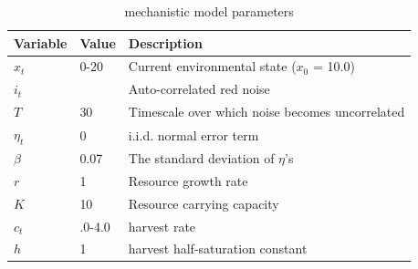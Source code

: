 \documentclass[openacc]{rsproca_new}%
\begin{document}
\begin{table}[H]
    \caption{\textcite{Tilman2024} mechanistic model parameters}
    \begin{tabular}{l|l|l}
    \hline
        \textbf{Variable} & \textbf{Value} & \textbf{Description} \\ \hline
        $x_t$ & 0-20 & Current environmental state ($x_0$ = 10.0) \\ 
        $i_t$ &  & Auto-correlated red noise \\ 
        $T$ & 30 & Timescale over which noise becomes uncorrelated \\ 
        $\eta_t$ & 0 & i.i.d. normal error term \\ 
        $\beta$ & 0.07 & The standard deviation of $\eta$'s \\ 
        $r$ & 1 & Resource growth rate \\ 
        $K$ & 10 & Resource carrying capacity \\ 
        $c_t$ & .0-4.0 & harvest rate \\ 
        $h$ & 1 & harvest half-saturation constant \\ \hline
    \end{tabular}
    \label{tab:def_params}
\end{table}
% 
% 
% 
% 



\end{document}
